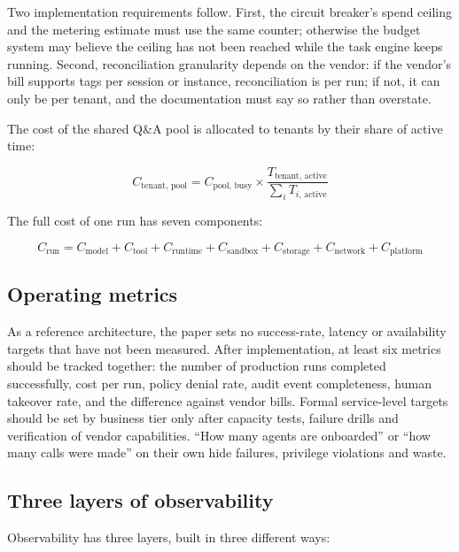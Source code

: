 Two implementation requirements follow. First, the circuit breaker's spend ceiling and the metering estimate must use the same counter; otherwise the budget system may believe the ceiling has not been reached while the task engine keeps running. Second, reconciliation granularity depends on the vendor: if the vendor's bill supports tags per session or instance, reconciliation is per run; if not, it can only be per tenant, and the documentation must say so rather than overstate.

The cost of the shared Q\&A pool is allocated to tenants by their share of active time:

\[
  C_{\text{tenant, pool}}
  =
  C_{\text{pool, busy}}
  \times
  \frac{T_{\text{tenant, active}}}{\sum_i T_{i,\,\text{active}}}
\]

The full cost of one run has seven components:

\[
  C_{\text{run}}
  = C_{\text{model}}
  + C_{\text{tool}}
  + C_{\text{runtime}}
  + C_{\text{sandbox}}
  + C_{\text{storage}}
  + C_{\text{network}}
  + C_{\text{platform}}
\]

\subsection{Operating metrics}

As a reference architecture, the paper sets no success-rate, latency or availability targets that have not been measured. After implementation, at least six metrics should be tracked together: the number of production runs completed successfully, cost per run, policy denial rate, audit event completeness, human takeover rate, and the difference against vendor bills. Formal service-level targets should be set by business tier only after capacity tests, failure drills and verification of vendor capabilities. ``How many agents are onboarded'' or ``how many calls were made'' on their own hide failures, privilege violations and waste.

\subsection{Three layers of observability}

Observability has three layers, built in three different ways:

